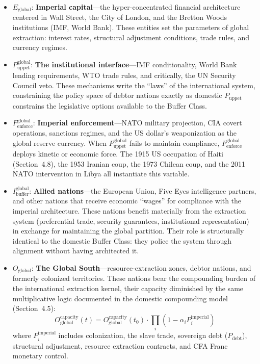 \begin{itemize}
    \item $E_{\text{global}}$: \textbf{Imperial capital}---the hyper-concentrated financial architecture centered in Wall Street, the City of London, and the Bretton Woods institutions (IMF, World Bank). These entities set the parameters of global extraction: interest rates, structural adjustment conditions, trade rules, and currency regimes.

    \item $P_{\text{uppet}}^{\text{global}}$: \textbf{The institutional interface}---IMF conditionality, World Bank lending requirements, WTO trade rules, and critically, the UN Security Council veto. These mechanisms write the ``laws'' of the international system, constraining the policy space of debtor nations exactly as domestic $P_{\text{uppet}}$ constrains the legislative options available to the Buffer Class.

    \item $F_{\text{enforce}}^{\text{global}}$: \textbf{Imperial enforcement}---NATO military projection, CIA covert operations, sanctions regimes, and the US dollar's weaponization as the global reserve currency. When $P_{\text{uppet}}^{\text{global}}$ fails to maintain compliance, $F_{\text{enforce}}^{\text{global}}$ deploys kinetic or economic force. The 1915 US occupation of Haiti (Section~4.8), the 1953 Iranian coup, the 1973 Chilean coup, and the 2011 NATO intervention in Libya all instantiate this variable.

    \item $I_{\text{buffer}}^{\text{global}}$: \textbf{Allied nations}---the European Union, Five Eyes intelligence partners, and other nations that receive economic ``wages'' for compliance with the imperial architecture. These nations benefit materially from the extraction system (preferential trade, security guarantees, institutional representation) in exchange for maintaining the global partition. Their role is structurally identical to the domestic Buffer Class: they police the system through alignment without having architected it.

    \item $O_{\text{global}}$: \textbf{The Global South}---resource-extraction zones, debtor nations, and formerly colonized territories. These nations bear the compounding burden of the international extraction kernel, their capacity diminished by the same multiplicative logic documented in the domestic compounding model (Section~4.5):
    \begin{equation}\label{eq:13.1-global-compounding-capacity}
O_{\text{global}}^{\text{capacity}}(t) = O_{\text{global}}^{\text{capacity}}(t_0) \cdot \prod_{i} (1 - \alpha_i P_i^{\text{imperial}})
\end{equation}
    where $P_i^{\text{imperial}}$ includes colonization, the slave trade, sovereign debt ($P_{\text{debt}}$), structural adjustment, resource extraction contracts, and CFA Franc monetary control.


\end{itemize}
